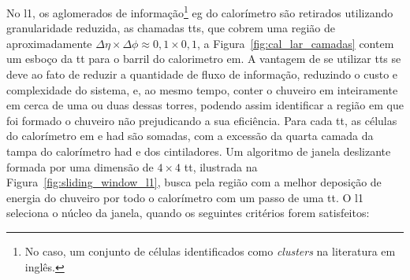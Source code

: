 No \gls{l1}, os aglomerados de informação\footnote{No caso, um conjunto de
células identificados como \emph{clusters} na literatura em inglês.} \gls{eg} do calorímetro são retirados
utilizando granularidade reduzida, as chamadas \glspl{tt}, que cobrem uma região
de aproximadamente $\Delta\eta\times\Delta\phi\approx0,1\times0,1$, 
a Figura~\ref{fig:cal_lar_camadas} contem um esboço da \gls{tt} para o
barril do calorimetro \gls{em}. A vantagem de se utilizar \glspl{tt} se deve ao
fato de reduzir a quantidade de fluxo de informação, reduzindo o custo e
complexidade do sistema, e, ao mesmo tempo, conter o chuveiro \gls{em} inteiramente 
em cerca de uma ou duas dessas torres, podendo
assim identificar a região em que foi formado o chuveiro não prejudicando a sua
eficiência. Para cada \gls{tt}, as células do calorímetro \gls{em} e \gls{had} são somadas, com a
excessão da quarta camada da tampa do calorímetro \gls{had} e dos cintiladores.
Um algoritmo de janela deslizante formada por uma dimensão de $4\times4$
\gls{tt}, ilustrada na Figura~\ref{fig:sliding_window_l1}, 
busca pela região com a melhor deposição de energia do chuveiro por
todo o calorímetro com um passo de uma \gls{tt}.
O \gls{l1} seleciona o núcleo da janela, quando
os seguintes critérios forem satisfeitos:

